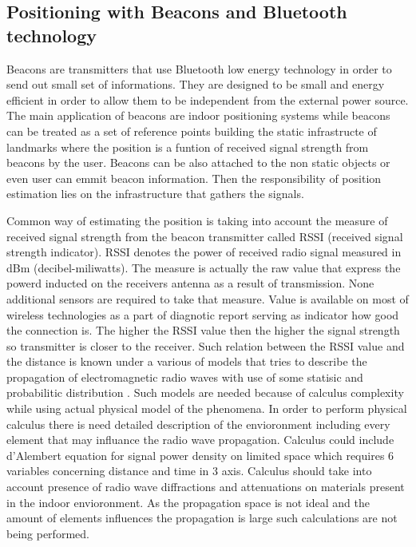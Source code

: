 \documentclass[../main.tex]{subfiles}
\begin{document}



\subsection{Positioning with Beacons and Bluetooth technology} %
\label{sec:positioning_with_beacons_and_bluetooth_technology}

Beacons are transmitters that use Bluetooth low energy technology in order to send out small set of informations. They are designed to be small and energy efficient in order to allow them to be independent from the external power source. The main application of beacons are indoor positioning systems while beacons can be treated as a set of reference points building the static infrastructe of landmarks where the position is a funtion of received signal strength from beacons by the user. Beacons can be also attached to the non static objects or even user can emmit beacon information. Then the responsibility of position estimation lies on the infrastructure that gathers the signals.

Common way of estimating the position is taking into account the measure of received signal strength from the beacon transmitter called RSSI (received signal strength indicator). RSSI denotes the power of received radio signal measured in dBm (decibel-miliwatts). The measure is actually the raw value that express the powerd inducted on the receivers antenna as a result of transmission. None additional sensors are required to take that measure. Value is available on most of wireless technologies as a part of diagnotic report serving as indicator how good the connection is. The higher the RSSI value then the higher the signal strength so transmitter is closer to the receiver. Such relation between the RSSI value and the distance is known under a various of models that tries to describe the propagation of electromagnetic radio waves with use of some statisic and probabilitic distribution \cite{RSSI_path_loss_prediction_model}. Such models are needed because of calculus complexity while using actual physical model of the phenomena. In order to perform physical calculus there is need detailed description of the envioronment including every element that may influance the radio wave propagation. Calculus could include d'Alembert equation for signal power density on limited space which requires 6 variables concerning distance and time in 3 axis. Calculus should take into account presence of radio wave diffractions and attenuations on materials present in the indoor envioronment. As the propagation space is not ideal and the amount of elements influences the propagation is large such calculations are not being performed.
\end{document}
